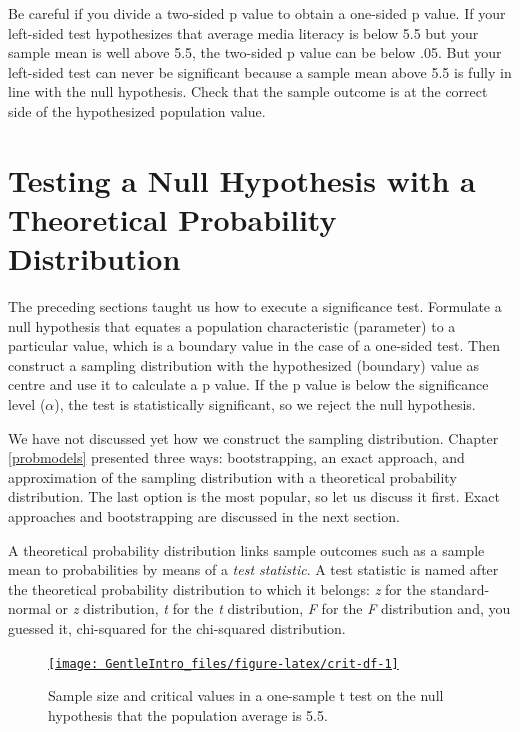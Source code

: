 \documentclass[a4paper]{book}
\theoremstyle{definition}
\theoremstyle{definition}
\theoremstyle{definition}
\theoremstyle{remark}
\begin{document}
Be careful if you divide a two-sided p value to obtain a one-sided p
value. If your left-sided test hypothesizes that average media literacy
is below 5.5 but your sample mean is well above 5.5, the two-sided p
value can be below .05. But your left-sided test can never be
significant because a sample mean above 5.5 is fully in line with the
null hypothesis. Check that the sample outcome is at the correct side of
the hypothesized population value.

\section{Testing a Null Hypothesis with a Theoretical Probability
Distribution}\label{testing-a-null-hypothesis-with-a-theoretical-probability-distribution}

The preceding sections taught us how to execute a significance test.
Formulate a null hypothesis that equates a population characteristic
(parameter) to a particular value, which is a boundary value in the case
of a one-sided test. Then construct a sampling distribution with the
hypothesized (boundary) value as centre and use it to calculate a p
value. If the p value is below the significance level (\(\alpha\)), the
test is statistically significant, so we reject the null hypothesis.

We have not discussed yet how we construct the sampling distribution.
Chapter \ref{probmodels} presented three ways: bootstrapping, an exact
approach, and approximation of the sampling distribution with a
theoretical probability distribution. The last option is the most
popular, so let us discuss it first. Exact approaches and bootstrapping
are discussed in the next section.

A theoretical probability distribution links sample outcomes such as a
sample mean to probabilities by means of a \emph{test statistic}. A test
statistic is named after the theoretical probability distribution to
which it belongs: \emph{z} for the standard-normal or \emph{z}
distribution, \emph{t} for the \emph{t} distribution, \emph{F} for the
\emph{F} distribution and, you guessed it, chi-squared for the
chi-squared distribution.

\begin{figure}[H]
\href{http://82.196.4.233:3838/apps/crit-df/}{\texttt{[image: GentleIntro\_files/figure-latex/crit-df-1]} }\caption{Sample size and critical values in a one-sample t test on the null hypothesis that the population average is 5.5.}\label{fig:crit-df}
\end{figure}
\end{document}
